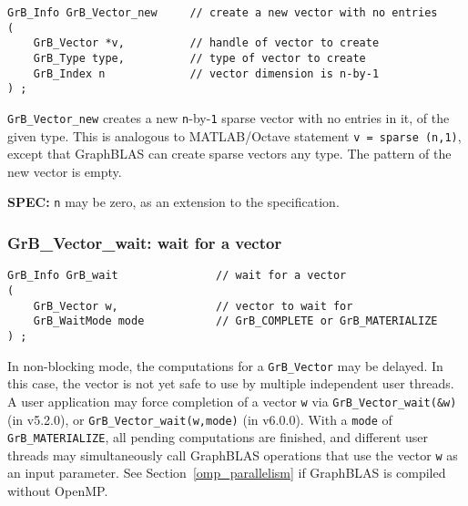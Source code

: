 \documentclass[12pt]{article}
\begin{document}
\begin{mdframed}[userdefinedwidth=6in]
{\footnotesize
\begin{verbatim}
GrB_Info GrB_Vector_new     // create a new vector with no entries
(
    GrB_Vector *v,          // handle of vector to create
    GrB_Type type,          // type of vector to create
    GrB_Index n             // vector dimension is n-by-1
) ;
\end{verbatim}
} \end{mdframed}

\verb'GrB_Vector_new' creates a new \verb'n'-by-\verb'1' sparse vector with no
entries in it, of the given type.  This is analogous to MATLAB/Octave statement
\verb'v = sparse (n,1)', except that GraphBLAS can create sparse vectors any
type.  The pattern of the new vector is empty.

\begin{alert}
{\bf SPEC:} \verb'n' may be zero, as an extension to the specification.
\end{alert}

\subsubsection{{\sf GrB\_Vector\_wait:} wait for a vector}
\label{vector_wait}

\begin{mdframed}[userdefinedwidth=6in]
{\footnotesize
\begin{verbatim}
GrB_Info GrB_wait               // wait for a vector
(
    GrB_Vector w,               // vector to wait for
    GrB_WaitMode mode           // GrB_COMPLETE or GrB_MATERIALIZE
) ;
\end{verbatim}
}\end{mdframed}

In non-blocking mode, the computations for a \verb'GrB_Vector' may be delayed.
In this case, the vector is not yet safe to use by multiple independent user
threads.  A user application may force completion of a vector \verb'w' via
\verb'GrB_Vector_wait(&w)' (in v5.2.0), or
\verb'GrB_Vector_wait(w,mode)' (in v6.0.0).
With a \verb'mode' of \verb'GrB_MATERIALIZE',
all pending computations are finished, and different user threads may
simultaneously call GraphBLAS operations that use the vector \verb'w' as an
input parameter.
See Section~\ref{omp_parallelism}
if GraphBLAS is compiled without OpenMP.
\end{document}
